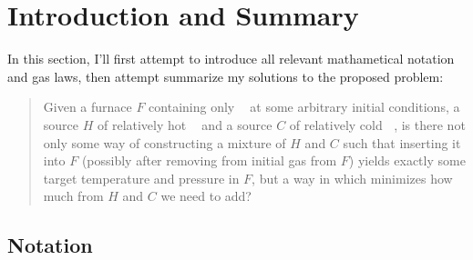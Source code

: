 \documentclass{article}
\DeclareMathOperator{\CDiox}{\mathrm{CO}_2}
\begin{document}
\section{Introduction and Summary}
In this section, I'll first attempt to introduce all relevant mathametical notation and gas laws,
then attempt summarize my solutions to the proposed problem:

\begin{quote}
    \begin{itshape}
        Given a furnace $F$ containing only $\CDiox$ at some arbitrary initial conditions, a source
        $H$ of relatively hot $\CDiox$ and a source $C$ of relatively cold $\CDiox$, is there not
        only some way of constructing a mixture of $H$ and $C$ such that inserting it into $F$
        (possibly after removing from initial gas from $F$) yields exactly some target temperature
        and pressure in $F$, but a way in which minimizes how much from $H$ and $C$ we need to add?
    \end{itshape}
\end{quote}

\subsection{Notation}
\end{document}
